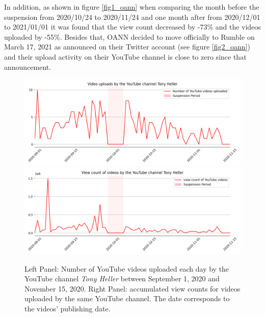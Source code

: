 \documentclass{article}
\begin{document}
In addition, as shown in figure \ref{fig1_oann} when comparing the month before the suspension from 2020/10/24 to 2020/11/24 and one month after from 2020/12/01 to 2021/01/01 it was found that the view count decreased by -73\% and the videos uploaded by -55\%. Besides that, OANN decided to move officially to Rumble on March 17, 2021 as announced on their Twitter account (see figure \ref{fig2_oann}) and their upload activity on their YouTube channel is close to zero since that announcement. 

\begin{figure}[h]
	\centering
			\includegraphics[scale=0.27]{../figure/Tony_Heller_videos_yt.png}
			\includegraphics[scale=0.27]{../figure/Tony_Heller_views_yt.png}
	\caption{Left Panel: Number of YouTube videos uploaded each day by the YouTube channel {\it Tony Heller} between September 1, 2020 and November 15, 2020. Right Panel: accumulated view counts for videos uploaded by the same YouTube channel. The date corresponds to the videos’  publishing date. 
}
	\label{fig1_tony}
\end{figure}
\end{document}
